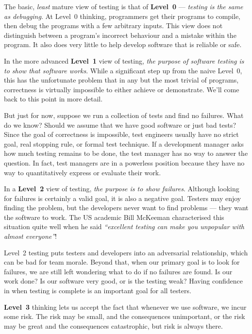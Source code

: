 The basic, {\it least} mature view of testing is that of {\bf Level~0} --- {\it
testing is the same as debugging}. At Level~0 thinking, programmers get their
programs to compile, then debug the programs with a few arbitrary inputs. This
view does not distinguish between a program's incorrect behaviour and a mistake
within the program. It also does very little to help develop software that is
reliable or safe.

In the more advanced {\bf Level~1} view of testing, {\it the purpose of software
testing is to show that software works}. While a significant step up from the
naive Level~0, this has the unfortunate problem that in any but the most trivial
of programs, correctness is virtually impossible to either achieve or
demonstrate. We'll come back to this point in more detail. 

But just for now, suppose we run a collection of tests and find no failures.
What do we know? Should we assume that we have good software or just bad tests?
Since the goal of correctness is impossible, test engineers usually have no
strict goal, real stopping rule, or formal test technique. If a development
manager asks how much testing remains to be done, the test manager has no way to
answer the question. In fact, test managers are in a powerless position because
they have no way to quantitatively express or evaluate their work.

In a {\bf Level~2} view of testing, {\it the purpose is to show failures}.
Although looking for failures is certainly a valid goal, it is also a negative
goal. Testers may enjoy finding the problem, but the developers never want to
find problems --- they want the software to work. 
%
%
The US academic Bill McKeeman characterised this situation quite well when he
said {\it ``excellent testing can make you unpopular with almost everyone''}!


Level~2 testing puts testers and developers into an adversarial relationship,
which can be bad for team morale. Beyond that, when our primary goal is to look
for failures, we are still left wondering what to do if no failures are found.
Is our work done? Is our software very good, or is the testing weak? Having
confidence in when testing is complete is an important goal for all testers.

{\bf Level~3} thinking lets us accept the fact that whenever we use software, we
incur some risk. The risk may be small, and the consequences unimportant, or the
risk may be great and the consequences catastrophic, but risk is always there.

